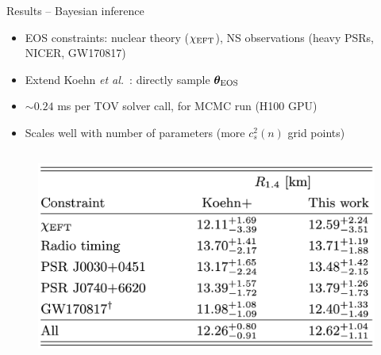 \documentclass[usenames,dvipsnames,t]{beamer}
\newcommand{\boldtheta}{\boldsymbol{\theta}}
\begin{document}
\begin{frame}{Results -- Bayesian inference}

  \def\x{2mm}
  \def\y{2mm}

  \begin{itemize}
    \item EOS constraints: nuclear theory ($\chi_{\rm{EFT}}$), NS observations (heavy PSRs, NICER, GW170817)

    \vspace{\y}

    \item Extend Koehn \textit{et al.}~\cite{Koehn:2024set}: directly sample $\boldtheta_{\rm{EOS}}$

    \vspace{\y}

    \item $\sim 0.24$ ms per TOV solver call,  for MCMC run (H100 GPU)

    \vspace{\y}

    \item Scales well with number of parameters (more $c_s^2(n)$ grid points)
  \end{itemize}


  \begin{columns}


    \begin{figure}[htpb]
      \centering
      \includegraphics[width=0.975\linewidth]{Figures/R14_table.jpg}
    \end{figure}


\end{columns}
\end{frame}
\end{document}
